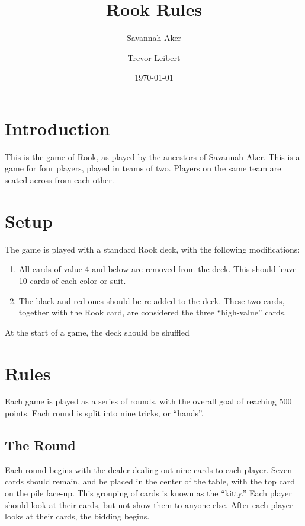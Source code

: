 \documentclass[10pt]{article}
\begin{document}
\title{Rook Rules}
\author{Savannah Aker
    \and
    Trevor Leibert}
\date{\today}

\maketitle
\pagebreak

\section{Introduction}

This is the game of Rook, as played by the ancestors of Savannah Aker.
This is a game for four players, played in teams of two.
Players on the same team are seated across from each other.

\section{Setup}

The game is played with a standard Rook deck, with the following modifications:

\begin{enumerate}
    \item All cards of value 4 and below are removed from the deck.
          This should leave 10 cards of each color or suit.
    \item The black and red ones should be re-added to the deck.
          These two cards, together with the Rook card, are considered the three ``high-value'' cards.
\end{enumerate}

At the start of a game, the deck should be shuffled

\section{Rules}

Each game is played as a series of rounds, with the overall goal of reaching 500 points.
Each round is split into nine tricks, or ``hands''.

\subsection{The Round}

Each round begins with the dealer dealing out nine cards to each player.
Seven cards should remain, and be placed in the center of the table, with the top card on the pile face-up.
This grouping of cards is known as the ``kitty.''
Each player should look at their cards, but not show them to anyone else.
After each player looks at their cards, the bidding begins.
\end{document}
